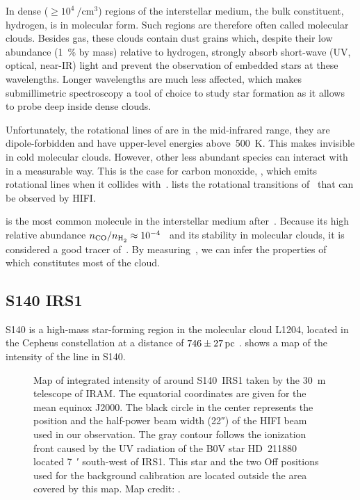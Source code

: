In dense ($\ge 10^{4} \: \si{\per\centi\meter\cubed}$) regions of the interstellar medium, the bulk constituent, hydrogen, is in molecular form.
Such regions are therefore often called molecular clouds.
Besides gas, these clouds contain dust grains which,
despite their low abundance (\SI{1}{\percent} by mass) relative to hydrogen,
strongly absorb short-wave (UV, optical, near-IR) light and prevent the observation of embedded stars at these wavelengths.
Longer wavelengths are much less affected, which makes submillimetric spectroscopy a tool of choice to study star formation as it allows to probe deep inside dense clouds.

Unfortunately, the rotational lines of  are in the mid-infrared range, they are dipole-forbidden and have upper-level energies above~\SI{500}{\kelvin}.
This makes  invisible in cold molecular clouds.
However, other less abundant species can interact with  in a measurable way.
This is the case for carbon monoxide, , which emits rotational lines when it collides with~.
 lists the rotational transitions of~ that can be observed by HIFI.

 is the most common molecule in the interstellar medium after~.
Because its high relative abundance $n_\text{\ce{CO}} / n_\text{\ce{H2}} \approx 10^{-4}$~\parencite{tielens2005physics} and its stability in molecular clouds, it is considered a good tracer of~.
By measuring~, we can infer the properties of~ which constitutes most of the cloud.



\subsection{S140 IRS1}
\label{sec:s140irs1}
S140 is a high-mass star-forming region in the molecular cloud L1204,
located in the Cepheus constellation at a distance of $746\pm\SI{27}{pc}$ \parencite{hirota2008}.
 shows a map of the intensity of the  line in S140.

\begin{figure}
    \centering
    
    \caption{
        Map of integrated intensity of  around S140~IRS1 taken by the \SI{30}{\meter} telescope of IRAM.
        The equatorial coordinates are given for the mean equinox J2000.
        The black circle in the center represents the position and the half-power beam width (\ang{;;22}) of the HIFI beam used in our observation.
        The gray contour follows the ionization front caused by the UV radiation of the B0V star HD~211880 located \SI{7}{\arcmin} south-west of IRS1.
        This star and the two Off positions used for the background calibration are located outside the area covered by this map.
        Map credit: \textcite{koumpia2015}.
    }
    \label{fig:12CO10_moment0}
\end{figure}

